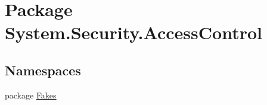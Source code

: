 \hypertarget{namespace_system_1_1_security_1_1_access_control}{\section{Package System.\-Security.\-Access\-Control}
\label{namespace_system_1_1_security_1_1_access_control}
}
\subsection*{Namespaces}
\begin{DoxyCompactItemize}
\item 
package \hyperlink{namespace_system_1_1_security_1_1_access_control_1_1_fakes}{Fakes}
\end{DoxyCompactItemize}
